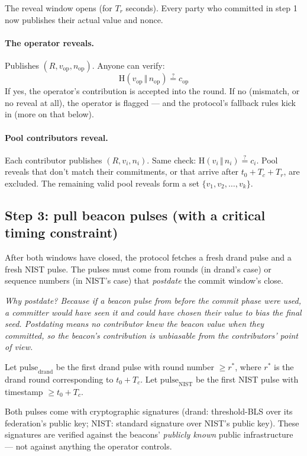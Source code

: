 \documentclass[11pt]{article}
\newenvironment{aside}{\par\medskip\noindent\itshape\small\color{black!70}}{\normalfont\par\medskip}
\newcommand{\Hash}{\mathrm{H}}
\begin{document}
The reveal window opens (for $T_r$ seconds). Every party who committed in step 1 now publishes their actual value and nonce.

\paragraph{The operator reveals.} Publishes $(R, v_{\text{op}}, n_{\text{op}})$. Anyone can verify:
\[
\Hash(v_{\text{op}} \,\Vert\, n_{\text{op}}) \stackrel{?}{=} c_{\text{op}}
\]
If yes, the operator's contribution is accepted into the round. If no (mismatch, or no reveal at all), the operator is flagged --- and the protocol's fallback rules kick in (more on that below).

\paragraph{Pool contributors reveal.} Each contributor publishes $(R, v_i, n_i)$. Same check: $\Hash(v_i \,\Vert\, n_i) \stackrel{?}{=} c_i$. Pool reveals that don't match their commitments, or that arrive after $t_0 + T_c + T_r$, are excluded. The remaining valid pool reveals form a set $\{v_1, v_2, \ldots, v_k\}$.

\subsection*{Step 3: pull beacon pulses (with a critical timing constraint)}

After both windows have closed, the protocol fetches a fresh drand pulse and a fresh NIST pulse. The pulses must come from rounds (in drand's case) or sequence numbers (in NIST's case) that \emph{postdate} the commit window's close.

\begin{aside}
Why postdate? Because if a beacon pulse from \emph{before} the commit phase were used, a committer would have seen it and could have chosen their value to bias the final seed. Postdating means no contributor knew the beacon value when they committed, so the beacon's contribution is unbiasable from the contributors' point of view.
\end{aside}

Let $\text{pulse}_{\text{drand}}$ be the first drand pulse with round number $\geq r^*$, where $r^*$ is the drand round corresponding to $t_0 + T_c$. Let $\text{pulse}_{\text{NIST}}$ be the first NIST pulse with timestamp $\geq t_0 + T_c$.

Both pulses come with cryptographic signatures (drand: threshold-BLS over its federation's public key; NIST: standard signature over NIST's public key). These signatures are verified against the beacons' \emph{publicly known} public infrastructure --- not against anything the operator controls.
\end{document}
